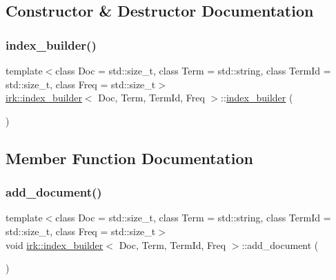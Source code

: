 \subsection{Constructor \& Destructor Documentation}
\mbox{\label{classirk_1_1index__builder_a00c690294474cf2ef39fcf94edc8b594}} 
\subsubsection{\texorpdfstring{index\+\_\+builder()}{index\_builder()}}
{\footnotesize\ttfamily template$<$class Doc  = std\+::size\+\_\+t, class Term  = std\+::string, class Term\+Id  = std\+::size\+\_\+t, class Freq  = std\+::size\+\_\+t$>$ \\
\mbox{\hyperlink{classirk_1_1index__builder}{irk\+::index\+\_\+builder}}$<$ Doc, Term, Term\+Id, Freq $>$\+::\mbox{\hyperlink{classirk_1_1index__builder}{index\+\_\+builder}} (\begin{DoxyParamCaption}{ }\end{DoxyParamCaption})\hspace{0.3cm}{\ttfamily [inline]}}



\subsection{Member Function Documentation}
\mbox{\label{classirk_1_1index__builder_a005813bfb531005ce2ca54a9f7cfd261}} 
\subsubsection{\texorpdfstring{add\+\_\+document()}{add\_document()}\hspace{0.1cm}{\footnotesize\ttfamily [1/2]}}
{\footnotesize\ttfamily template$<$class Doc  = std\+::size\+\_\+t, class Term  = std\+::string, class Term\+Id  = std\+::size\+\_\+t, class Freq  = std\+::size\+\_\+t$>$ \\
void \mbox{\hyperlink{classirk_1_1index__builder}{irk\+::index\+\_\+builder}}$<$ Doc, Term, Term\+Id, Freq $>$\+::add\+\_\+document (\begin{DoxyParamCaption}{ }\end{DoxyParamCaption})\hspace{0.3cm}{\ttfamily [inline]}}



